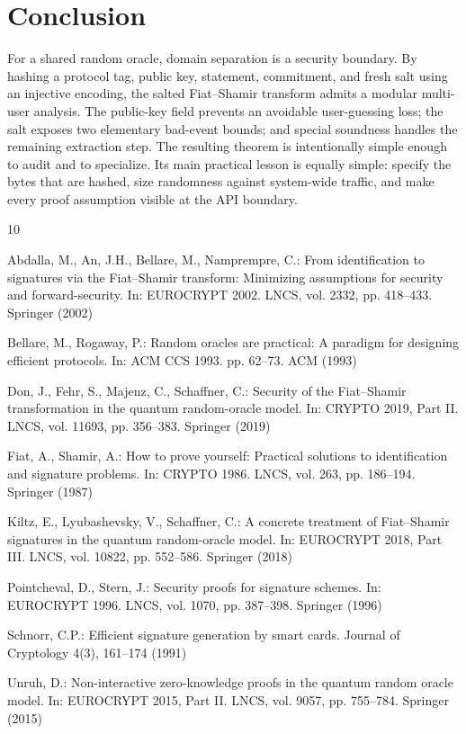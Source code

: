 \section{Conclusion}
\label{sec:conclusion}

For a shared random oracle, domain separation is a security boundary.  By
hashing a protocol tag, public key, statement, commitment, and fresh salt using
an injective encoding, the salted Fiat--Shamir transform admits a modular
multi-user analysis.  The public-key field prevents an avoidable user-guessing
loss; the salt exposes two elementary bad-event bounds; and special soundness
handles the remaining extraction step.  The resulting theorem is intentionally
simple enough to audit and to specialize.  Its main practical lesson is
equally simple: specify the bytes that are hashed, size randomness against
system-wide traffic, and make every proof assumption visible at the API
boundary.

\begin{thebibliography}{10}

Abdalla, M., An, J.H., Bellare, M., Namprempre, C.:
From identification to signatures via the Fiat--Shamir transform: Minimizing
assumptions for security and forward-security.
In: EUROCRYPT 2002. LNCS, vol. 2332, pp. 418--433. Springer (2002)

Bellare, M., Rogaway, P.:
Random oracles are practical: A paradigm for designing efficient protocols.
In: ACM CCS 1993. pp. 62--73. ACM (1993)

Don, J., Fehr, S., Majenz, C., Schaffner, C.:
Security of the Fiat--Shamir transformation in the quantum random-oracle model.
In: CRYPTO 2019, Part II. LNCS, vol. 11693, pp. 356--383. Springer (2019)

Fiat, A., Shamir, A.:
How to prove yourself: Practical solutions to identification and signature
problems.
In: CRYPTO 1986. LNCS, vol. 263, pp. 186--194. Springer (1987)

Kiltz, E., Lyubashevsky, V., Schaffner, C.:
A concrete treatment of Fiat--Shamir signatures in the quantum random-oracle
model.
In: EUROCRYPT 2018, Part III. LNCS, vol. 10822, pp. 552--586. Springer (2018)

Pointcheval, D., Stern, J.:
Security proofs for signature schemes.
In: EUROCRYPT 1996. LNCS, vol. 1070, pp. 387--398. Springer (1996)

Schnorr, C.P.:
Efficient signature generation by smart cards.
Journal of Cryptology 4(3), 161--174 (1991)

Unruh, D.:
Non-interactive zero-knowledge proofs in the quantum random oracle model.
In: EUROCRYPT 2015, Part II. LNCS, vol. 9057, pp. 755--784. Springer (2015)

\end{thebibliography}

\appendix
\renewcommand{\theHsection}{appendix.\Alph{section}}
